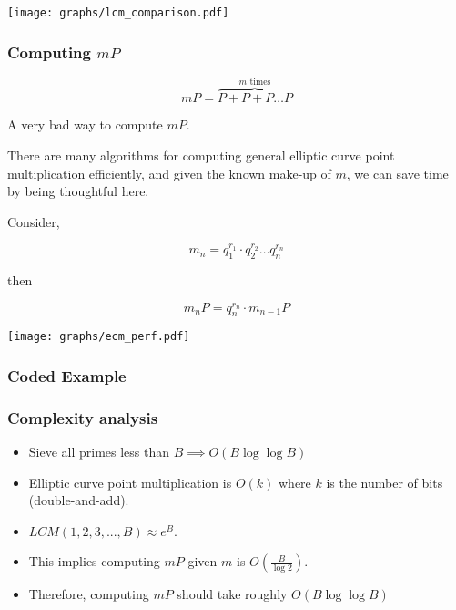 \documentclass{beamer}
\begin{document}
\begin{frame}

\texttt{[image: graphs/lcm\_comparison.pdf]}

\end{frame}

\begin{frame}
\frametitle{Computing $mP$}

\[ mP = \overbrace{P + P + P \ldots P}^\text{$m$ times} \]
\begin{center}
    A very bad way to compute $mP$.
\end{center}

There are many algorithms for computing general elliptic curve point
multiplication efficiently, and given the known make-up of $m$, we can
save time by being thoughtful here.

Consider,

\[ m_n = q_1^{r_1} \cdot q_2^{r_2} \ldots q_n^{r_n} \]

then

\[ m_nP = q_n^{r_n} \cdot m_{n-1}P \]

\end{frame}

\begin{frame}

\texttt{[image: graphs/ecm\_perf.pdf]}

\end{frame}

\begin{frame}
\frametitle{Coded Example}



\end{frame}

\begin{frame}
\frametitle{Complexity analysis}

\pause

\begin{itemize}[<+->]
	\item Sieve all primes less than $B \implies O(B \log \log B)$ \\
	\item Elliptic curve point multiplication is $O(k)$ where $k$ is the number of
		bits (double-and-add). \\
	\item $LCM(1,2,3,...,B) \approx e^B$.
	\item This implies computing $mP$ given $m$ is $O\left(\frac{B}{\log 2}\right)$.
	\item Therefore, computing $mP$ should take roughly $O(B \log \log B)$ \\
\end{itemize}

\end{frame}
\end{document}
